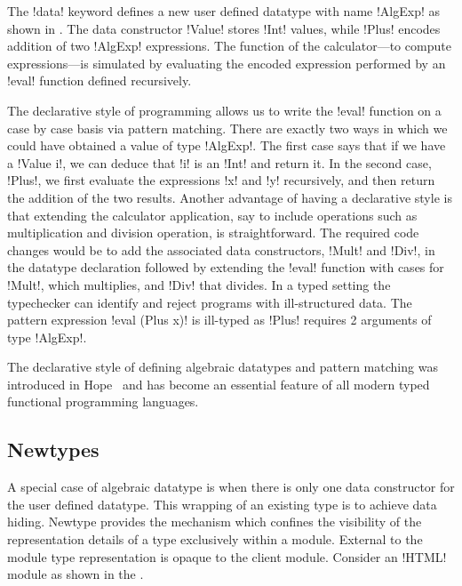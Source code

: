 \documentclass[screen,nonacm,manuscript,review]{acmart} %
\begin{document}
The !data! keyword defines a new user defined datatype with name
!AlgExp! as shown in . The data constructor
!Value! stores !Int! values, while !Plus! encodes addition
of two !AlgExp! expressions. The function of the
calculator---to compute expressions---is simulated
by evaluating the encoded expression performed by an !eval!
function defined recursively.

The declarative style of programming allows us to write the !eval!
function on a case by case basis via pattern
matching. There are exactly two ways in which we could have obtained a
value of type !AlgExp!. The first case says
that if we have a !Value i!, we can deduce that
!i! is an !Int! and return it. In the second case, !Plus!, we first
evaluate the expressions !x! and !y! recursively, and then return the
addition of the two results. Another advantage of having a declarative
style is that extending the calculator application, say to include
operations such as multiplication and division operation, is
straightforward. The required code changes would be to add the
associated data constructors, !Mult! and !Div!, in the datatype
declaration followed by extending the !eval! function with cases for
!Mult!, which multiplies, and !Div! that divides.
In a typed setting the typechecker can identify and reject programs
with ill-structured data. The pattern expression !eval (Plus x)! is
ill-typed as !Plus! requires 2 arguments of type !AlgExp!.

The declarative style of defining algebraic datatypes
and pattern matching was introduced in
Hope~\cite{burstall_proving_1969, burstall_hope_1980} and has become an
essential feature of all modern typed functional programming languages.

\subsection{Newtypes}\label{subsubsec:gen-abs-types}
A special case of algebraic datatype is when there is only
one data constructor for the user defined datatype. This wrapping
of an existing type is to achieve data hiding.
Newtype provides the mechanism which confines the
visibility of the representation details of a type
exclusively within a module. External to the module type
representation is opaque to the client
module. Consider an !HTML! module as shown in the .
\end{document}
